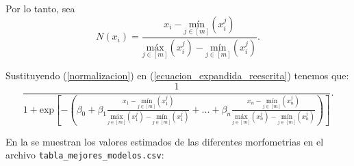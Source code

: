 \documentclass{article}
\begin{document}
\begin{flushleft}
Por lo tanto, sea 
\begin{equation} \label{normalizacion} N\left ( x_{i} \right )= \frac{x_{i} - \underset{j\in [m ]}{\mbox{mín}}\left (  x_{i}^{j}\right )}{\underset{j\in [m ]}{\mbox{máx}}\left (  x_{i}^{j}\right )-\underset{j\in [m ]}{\mbox{mín}}\left (  x_{i}^{j}\right )} .
\end{equation}

Sustituyendo (\ref{normalizacion}) en (\ref{ecuacion_expandida_reescrita}) tenemos que: 
\begin{equation} \label{ecuacion_chorizo}
    \frac{1}{1+\mbox{exp}\left [ -\left ( \beta _{0} + \beta _{1}\frac{x_{1}- \underset{j\in [m]}{\mbox{mín}}\left (x_{1}^{j}\right )}{\underset{j\in [m ]}{\mbox{máx}}\left (x_{1}^{j}\right )-\underset{j\in [m]}{\mbox{mín}}\left (  x_{1}^{j}\right )}+...+\beta_{n}\frac{x_{n} - \underset{j\in [m]}{\mbox{mín}}\left (  x_{n}^{j}\right )}{\underset{j\in [m]}{\mbox{máx}}\left (  x_{n}^{j}\right )-\underset{j\in [m]}{\mbox{mín}}\left (  x_{n}^{j}\right )}\right ) \right ]} .
\end{equation}


\newpage


En la  se muestran los valores estimados de las diferentes morfometrias en el archivo \texttt{tabla\_mejores\_modelos.csv}:


\end{flushleft}
\end{document}
